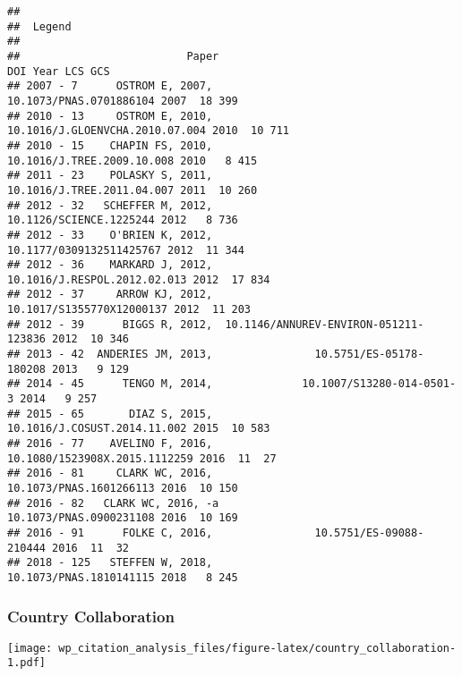\documentclass[]{article}
\begin{document}
\begin{verbatim}
## 
##  Legend
## 
##                          Paper                                   DOI Year LCS GCS
## 2007 - 7      OSTROM E, 2007,                10.1073/PNAS.0701886104 2007  18 399
## 2010 - 13     OSTROM E, 2010,        10.1016/J.GLOENVCHA.2010.07.004 2010  10 711
## 2010 - 15    CHAPIN FS, 2010,             10.1016/J.TREE.2009.10.008 2010   8 415
## 2011 - 23    POLASKY S, 2011,             10.1016/J.TREE.2011.04.007 2011  10 260
## 2012 - 32   SCHEFFER M, 2012,                10.1126/SCIENCE.1225244 2012   8 736
## 2012 - 33    O'BRIEN K, 2012,               10.1177/0309132511425767 2012  11 344
## 2012 - 36    MARKARD J, 2012,           10.1016/J.RESPOL.2012.02.013 2012  17 834
## 2012 - 37     ARROW KJ, 2012,              10.1017/S1355770X12000137 2012  11 203
## 2012 - 39      BIGGS R, 2012,  10.1146/ANNUREV-ENVIRON-051211-123836 2012  10 346
## 2013 - 42  ANDERIES JM, 2013,                10.5751/ES-05178-180208 2013   9 129
## 2014 - 45      TENGO M, 2014,              10.1007/S13280-014-0501-3 2014   9 257
## 2015 - 65       DIAZ S, 2015,           10.1016/J.COSUST.2014.11.002 2015  10 583
## 2016 - 77    AVELINO F, 2016,          10.1080/1523908X.2015.1112259 2016  11  27
## 2016 - 81     CLARK WC, 2016,                10.1073/PNAS.1601266113 2016  10 150
## 2016 - 82   CLARK WC, 2016, -a               10.1073/PNAS.0900231108 2016  10 169
## 2016 - 91      FOLKE C, 2016,                10.5751/ES-09088-210444 2016  11  32
## 2018 - 125   STEFFEN W, 2018,                10.1073/PNAS.1810141115 2018   8 245
\end{verbatim}

\hypertarget{country-collaboration}{%
\subsubsection{Country Collaboration}\label{country-collaboration}}

\texttt{[image: wp\_citation\_analysis\_files/figure-latex/country\_collaboration-1.pdf]}
\end{document}
